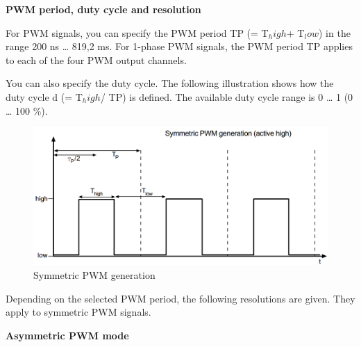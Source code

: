 \noindent \textbf{PWM period, duty cycle and resolution}\par

For PWM signals, you can specify the PWM period TP (= T$_high$+ T$_low$) in the range 200 ns … 819,2 ms. For 1-phase PWM signals, the PWM period TP applies to each of the four PWM output channels.

You can also specify the duty cycle. The following illustration shows how the duty cycle d (= T$_high$/ TP) is defined. The available duty cycle range is 0 … 1 (0 … 100 \%).

\begin{figure}[H]
    \centering
    \includegraphics[width=\textwidth]{Images/Symmetric PWM generation.png}
    \caption{Symmetric PWM generation}
\end{figure}

Depending on the selected PWM period, the following resolutions are given. They apply to symmetric PWM signals.



\noindent \textbf{Asymmetric PWM mode}

